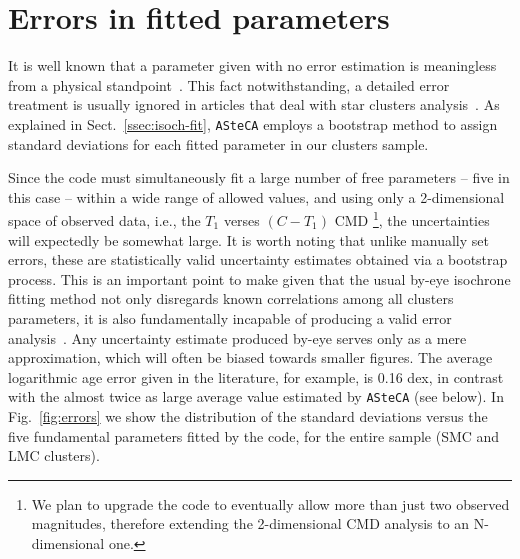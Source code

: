 \documentclass{aa}
\begin{document}

\section{Errors in fitted parameters}
\label{sec:errors-fit}

It is well known that a parameter given with no error estimation is
meaningless from a physical standpoint~\citep{Dolphin_2002,Andrae_2010}.
%
This fact notwithstanding, a detailed error treatment is usually ignored in
articles that deal with star clusters analysis~\citep{Paunzen_2006}.
As explained in Sect.~\ref{ssec:isoch-fit}, \texttt{ASteCA} employs a bootstrap
method to assign standard deviations for each fitted parameter in our clusters
sample.

Since the code must simultaneously fit a large number of free parameters --
five in this case -- within a wide range of allowed values, and using only a
2-dimensional space of observed data, i.e., the $T_1$ verses $(C-T_1)$ CMD
\footnote{We plan to upgrade the code to eventually allow
more than just two observed magnitudes, therefore extending the 2-dimensional
CMD analysis to an N-dimensional one.}, the uncertainties will expectedly be
somewhat large.
%
It is worth noting that unlike manually set errors, these are
statistically valid uncertainty estimates obtained via a bootstrap process.
This is an important point to make given that the usual by-eye isochrone fitting
method not only disregards known correlations among all clusters parameters,
it is also fundamentally incapable of producing a valid error
analysis~\citep{Naylor_2006}. Any uncertainty estimate produced by-eye serves
only as a mere approximation, which will often be biased towards smaller
figures. The average logarithmic age error given in the literature, for example,
is 0.16 dex, in contrast with the almost twice as large average value estimated
by \texttt{ASteCA} (see below).
%
In Fig.~\ref{fig:errors} we show the distribution of the standard deviations
versus the five fundamental parameters fitted by the code, for the entire sample
(SMC and LMC clusters).
\end{document}

